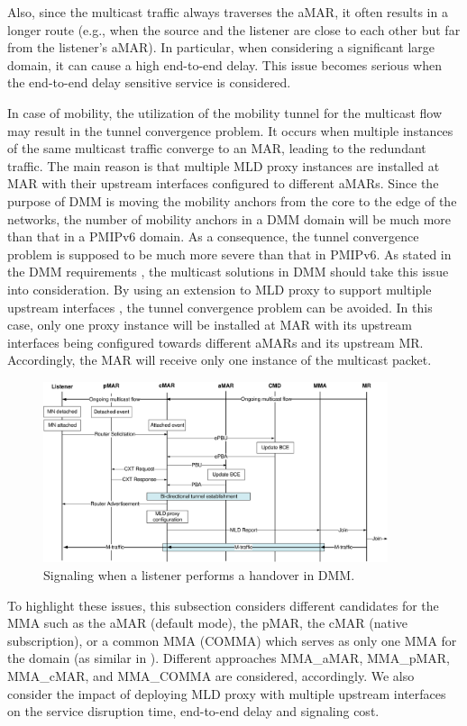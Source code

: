 Also, since the multicast traffic always traverses the aMAR, it often results in a longer route (e.g., when the source and the listener are close to each other but far from the listener's aMAR). In particular, when considering a significant large domain, it can cause a high end-to-end delay. This issue becomes serious when the end-to-end delay sensitive service is considered. 

In case of mobility, the utilization of the mobility tunnel for the multicast flow may result in the tunnel convergence problem. It occurs when multiple instances of the same multicast traffic converge to an MAR, leading to the redundant traffic. The main reason is that multiple MLD proxy instances are installed at MAR with their upstream interfaces configured to different aMARs. Since the purpose of DMM is moving the mobility anchors from the core to the edge of the networks, the number of mobility anchors in a DMM domain will be much more than that in a PMIPv6 domain. As a consequence, the tunnel convergence problem is supposed to be much more severe than that in PMIPv6. As stated in the DMM requirements \cite{DMM_requirements}, the multicast solutions in DMM should take this issue into consideration. By using an extension to MLD proxy to support multiple upstream interfaces \cite{multiple_upstreams}, the tunnel convergence problem can be avoided. In this case, only one proxy instance will be installed at MAR with its upstream interfaces being configured towards different aMARs and its upstream MR. Accordingly, the MAR will receive only one instance of the multicast packet.
\begin{figure}[tb!] 
  \begin{center} 
    \includegraphics[width=0.90\textwidth]{./Part3/Chapter8/figures/c10_service_disruption_common.eps} 
    \caption[Signaling when a listener performs a handover in DMM.]{Signaling when a listener performs a handover in DMM.}
    \label{fig:c10_HO}
  \end{center} 
\end{figure}
To highlight these issues, this subsection considers different candidates for the MMA such as the aMAR (default mode), the pMAR, the cMAR (native subscription), or a common MMA (COMMA) which serves as only one MMA for the domain (as similar in \cite{direct_routing_mtma}). Different approaches MMA\_aMAR, MMA\_pMAR, MMA\_cMAR, and MMA\_COMMA are considered, accordingly. We also consider the impact of deploying MLD proxy with multiple upstream interfaces on the service disruption time, end-to-end delay and signaling cost. 

